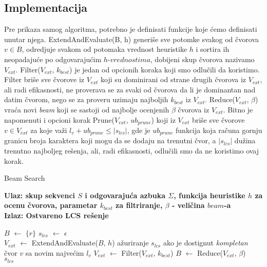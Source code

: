\documentclass{article}
\begin{document}
    \subsection{Implementacija}
    Pre prikaza samog algoritma, potrebno je definisati funkcije koje ćemo definisati unutar njega.\newline
    \indent ExtendAndEvaluate(B, h) generiše sve potomke svakog od čvorova $v \in B$, odredjuje svakom od potomaka vrednost heuristike $h$ i sortira ih neopadajuće po odgovarajućim $h$-$vrednostima$, dobijeni skup čvorova nazivamo $V_{ext}$. Filter($V_{ext}$, $k_{best}$) je jedan od opcionih koraka koji smo odlučili da koristimo. Filter briše sve čvorove iz $V_{ext}$ koji su dominirani od strane drugih čvorova iz $V_{ext}$, ali radi efikasnosti, ne proverava se za svaki od čvorova da li je dominantan nad datim čvorom, nego se za proveru uzimaju najboljih $k_{best}$ iz $V_{ext}$. Reduce($V_{ext}$, $\beta$) vraća novi \emph{beam} koji se sastoji od najbolje ocenjenih $\beta$ čvorova iz $V_{ext}$. Bitno je napomenuti i opcioni korak Prune($V_{ext}$, $ub_{prune}$) koji iz $V_{ext}$ briše sve čvorove $v \in V_{ext}$ za koje važi $l_v + ub_{prune} \leq |s_{lcs}|$, gde je $ub_{prune}$ funkcija koja računa gornju granicu broja karaktera koji mogu da se dodaju na trenutni čvor, a $|s_{lcs}|$ dužina trenutno najboljeg rešenja, ali, radi efikasnosti, odlučili smo da ne koristimo ovaj korak.

    \begin{algorithm}
        \caption{Beam Search}
        \hspace*{\algorithmicindent} \textbf{Ulaz: skup sekvenci $S$ i odgovarajuća azbuka $\Sigma$, funkcija heuristike $h$ za ocenu čvorova, parametar $k_{best}$ za filtriranje, $\beta$ - veličina $beam$-a}\\
        \hspace*{\algorithmicindent} \textbf{Izlaz: Ostvareno LCS rešenje}
        \begin{algorithmic}
            \State \texttt{$B$} $\gets$ \texttt{$\{r\}$}
            \State \texttt{$s_{lcs}$} $\gets$ \texttt{$\epsilon$}
                \do \\
                \State \texttt{$V_{ext}$} $\gets$ ExtendAndEvaluate($B$, $h$)
                \State ažuriranje $s_{lcs}$ ako je dostignut \emph{kompletan} čvor $v$ sa novim najvećim $l_v$
                \State \texttt{$V_{ext}$} $\gets$ Filter($V_{ext}$, $k_{best}$)
                \State \texttt{$B$} $\gets$ Reduce($V_{ext}$, $\beta$)
            \EndWhile \\
            \Return \texttt{$s_{lcs}$}
        \end{algorithmic}
    \end{algorithm}
\end{document}

